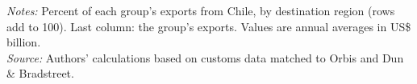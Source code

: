 \documentclass[11pt,a4paper]{article}
\begin{document}
\begin{table}[H]\centering\small%
  \caption{Chile, Other Goods: Multinational Exports by Parent Region and Destination Region}%
  \label{tab:c_reg_CHL_rest}%
  \par\vspace{3pt}%
  \begin{minipage}{0.95\textwidth}\footnotesize %
  \textit{Notes:} Percent of each group's exports from Chile, by destination region (rows add to 100). Last column: the group's exports. Values are annual averages in US\$ billion.\\[3pt]%
  \textit{Source:} Authors' calculations based on customs data matched to Orbis and Dun \& Bradstreet.%
  \end{minipage}%
  \end{table}
\end{document}
